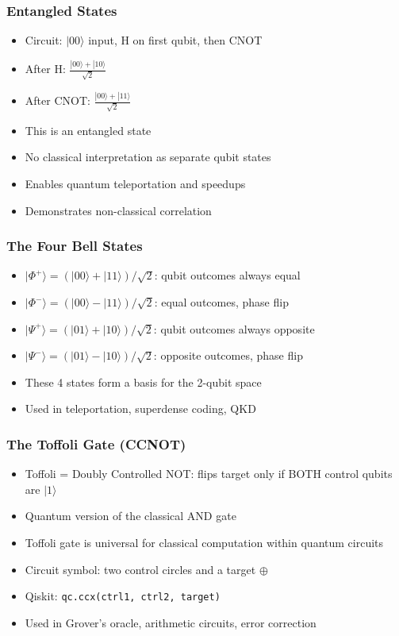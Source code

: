 \begin{frame}[fragile]\frametitle{Entangled States}
\begin{itemize}
\item Circuit: $|00\rangle$ input, H on first qubit, then CNOT
\item After H: $\frac{|00\rangle + |10\rangle}{\sqrt{2}}$
\item After CNOT: $\frac{|00\rangle + |11\rangle}{\sqrt{2}}$
\item This is an entangled state
\item No classical interpretation as separate qubit states
\item Enables quantum teleportation and speedups
\item Demonstrates non-classical correlation
\end{itemize}
\end{frame}

\begin{frame}[fragile]\frametitle{The Four Bell States}
\begin{itemize}
\item $|\Phi^+\rangle = (|00\rangle + |11\rangle)/\sqrt{2}$: qubit outcomes always equal
\item $|\Phi^-\rangle = (|00\rangle - |11\rangle)/\sqrt{2}$: equal outcomes, phase flip
\item $|\Psi^+\rangle = (|01\rangle + |10\rangle)/\sqrt{2}$: qubit outcomes always opposite
\item $|\Psi^-\rangle = (|01\rangle - |10\rangle)/\sqrt{2}$: opposite outcomes, phase flip
\item These 4 states form a basis for the 2-qubit space
\item Used in teleportation, superdense coding, QKD
\end{itemize}
\end{frame}

\begin{frame}[fragile]\frametitle{The Toffoli Gate (CCNOT)}
\begin{itemize}
\item Toffoli = Doubly Controlled NOT: flips target only if BOTH control qubits are $|1\rangle$
\item Quantum version of the classical AND gate
\item Toffoli gate is universal for classical computation within quantum circuits
\item Circuit symbol: two control circles and a target $\oplus$
\item Qiskit: \texttt{qc.ccx(ctrl1, ctrl2, target)}
\item Used in Grover's oracle, arithmetic circuits, error correction
\end{itemize}
\end{frame}

